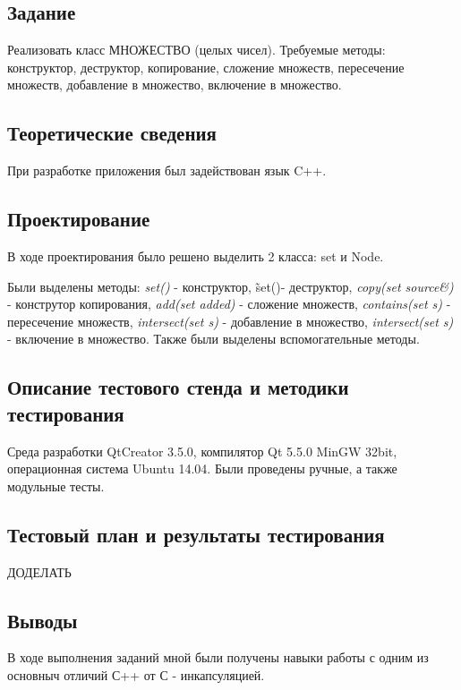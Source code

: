 \documentclass[12pt,a4paper]{report}
\begin{document}
\subsection{Задание}
\hspace{\parindent}
Реализовать класс МНОЖЕСТВО (целых чисел). Требуемые методы: конструктор, деструктор, копирование, сложение множеств, пересечение множеств, добавление в множество, включение в множество.
\subsection{Теоретические сведения}
\hspace{\parindent}
При разработке приложения был задействован язык C++. 

\subsection{Проектирование}
\hspace{\parindent}
В ходе проектирования было решено выделить 2 класса: set и Node.

\hspace{\parindent}
Были выделены методы: \textit{set()} - конструктор, \~set()- деструктор, \textit{copy(set source\&)} - конструтор копирования, \textit{add(set added)} - сложение множеств, \textit{contains(set s)} - пересечение множеств, \textit{intersect(set s)} - добавление в множество, \textit{intersect(set s)} - включение в множество.
Также были выделены вспомогательные методы.


\subsection{Описание тестового стенда и методики тестирования}
Среда разработки QtCreator 3.5.0, компилятор Qt 5.5.0 MinGW 32bit, операционная система Ubuntu 14.04. Были проведены ручные, а также модульные тесты.

\subsection{Тестовый план и результаты тестирования}
ДОДЕЛАТЬ
\subsection{Выводы}
\hspace{\parindent}
В ходе выполнения заданий мной были получены навыки работы с одним из основныч отличий С++ от С - инкапсуляцией.
\end{document}
